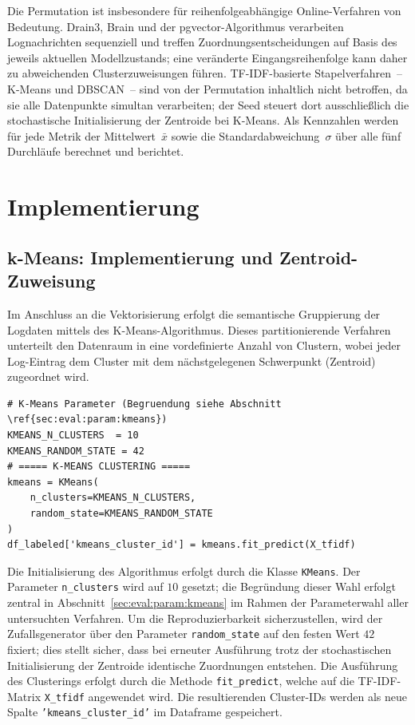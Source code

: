 Die Permutation ist insbesondere für reihenfolgeabhängige Online-Verfahren von Bedeutung.
Drain3, Brain und der pgvector-Algorithmus verarbeiten Lognachrichten sequenziell und
treffen Zuordnungsentscheidungen auf Basis des jeweils aktuellen Modellzustands; eine
veränderte Eingangsreihenfolge kann daher zu abweichenden Clusterzuweisungen führen.
TF-IDF-basierte Stapelverfahren~-- K-Means und DBSCAN~-- sind von der Permutation
inhaltlich nicht betroffen, da sie alle Datenpunkte simultan verarbeiten; der Seed
steuert dort ausschließlich die stochastische Initialisierung der Zentroide bei K-Means.
Als Kennzahlen werden für jede Metrik der Mittelwert~$\bar{x}$ sowie die
Standardabweichung~$\sigma$ über alle fünf Durchläufe berechnet und berichtet.


\chapter{Implementierung}

\section{k-Means: Implementierung und Zentroid-Zuweisung}
\label{sec:real:kmeans}
Im Anschluss an die Vektorisierung erfolgt die semantische Gruppierung der Logdaten mittels des K-Means-Algorithmus. Dieses partitionierende Verfahren unterteilt den Datenraum in eine vordefinierte Anzahl von Clustern, wobei jeder Log-Eintrag dem Cluster mit dem nächstgelegenen Schwerpunkt (Zentroid) zugeordnet wird.

\begin{lstlisting}[caption={Clustern mit k-Means}, label={lst:k-means-cluster}]
# K-Means Parameter (Begruendung siehe Abschnitt \ref{sec:eval:param:kmeans})
KMEANS_N_CLUSTERS  = 10
KMEANS_RANDOM_STATE = 42
# ===== K-MEANS CLUSTERING =====
kmeans = KMeans(
    n_clusters=KMEANS_N_CLUSTERS,
    random_state=KMEANS_RANDOM_STATE
)
df_labeled['kmeans_cluster_id'] = kmeans.fit_predict(X_tfidf)
\end{lstlisting}

Die Initialisierung des Algorithmus erfolgt durch die Klasse \texttt{KMeans}.
Der Parameter \texttt{n\_clusters} wird auf $10$ gesetzt; die Begründung
dieser Wahl erfolgt zentral in Abschnitt~\ref{sec:eval:param:kmeans} im
Rahmen der Parameterwahl aller untersuchten Verfahren. Um die
Reproduzierbarkeit sicherzustellen, wird der Zufallsgenerator über den
Parameter \texttt{random\_state} auf den festen Wert $42$ fixiert; dies
stellt sicher, dass bei erneuter Ausführung trotz der stochastischen
Initialisierung der Zentroide identische Zuordnungen entstehen. Die
Ausführung des Clusterings erfolgt durch die Methode \texttt{fit\_predict},
welche auf die TF-IDF-Matrix \texttt{X\_tfidf} angewendet wird. Die
resultierenden Cluster-IDs werden als neue Spalte
\texttt{'kmeans\_cluster\_id'} im Dataframe gespeichert.

